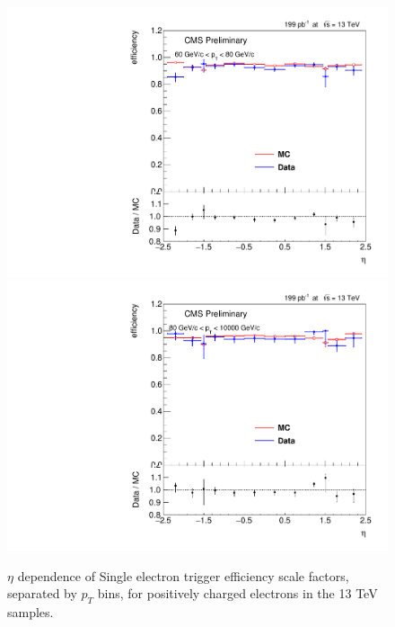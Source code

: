 \begin{figure}
\includegraphics[width=0.45\linewidth]{plots/efficiency/13_zeehlt_positive/PtBins_eta_pt10.pdf}
\includegraphics[width=0.45\linewidth]{plots/efficiency/13_zeehlt_positive/PtBins_eta_pt11.pdf}
\caption{$\eta$ dependence of Single electron trigger efficiency scale factors, separated by $p_T$ bins, for positively charged electrons in the 13 TeV samples.}
\label{fig:Eff:el:13:HLT:pos}
\end{figure}

